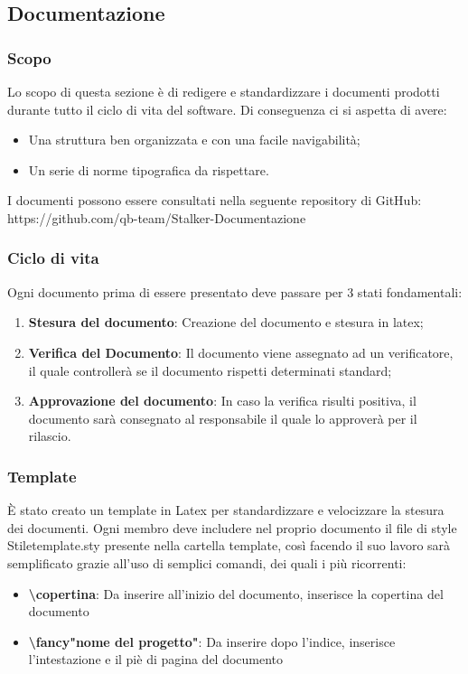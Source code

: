 \subsection{Documentazione}
\subsubsection{Scopo}
Lo scopo di questa sezione è di redigere e standardizzare i documenti prodotti durante tutto il ciclo di vita del software. 
Di conseguenza ci si aspetta di avere:
\begin{itemize}
\item Una struttura ben organizzata e con una facile navigabilità;
\item Un serie di norme tipografica da rispettare.
\end{itemize}
 
I documenti possono essere consultati nella seguente repository di GitHub: https://github.com/qb-team/Stalker-Documentazione

\subsubsection{Ciclo di vita}
Ogni documento prima di essere presentato deve passare per 3 stati fondamentali:
\begin{enumerate}
\item \textbf{Stesura del documento}: Creazione del documento e stesura in latex;
\item \textbf{Verifica del Documento}: Il documento viene assegnato ad un verificatore, il quale controllerà se il documento rispetti determinati standard;
\item \textbf{Approvazione del documento}: In caso la verifica risulti positiva, il documento sarà consegnato al responsabile il quale lo approverà per il rilascio.
\end{enumerate}

\subsubsection{Template}
È stato creato un template in Latex per standardizzare e velocizzare la stesura dei documenti.
Ogni membro deve includere nel proprio documento il file di style Stiletemplate.sty presente nella cartella template, così facendo il suo lavoro sarà semplificato grazie all'uso di semplici comandi, dei quali i più ricorrenti:
\begin{itemize}
\item \textbf{\textbackslash copertina{}}: Da inserire all'inizio del documento, inserisce la copertina del documento
\item \textbf{\textbackslash fancy"nome del progetto"{}}: Da inserire dopo l'indice, inserisce l'intestazione e il piè di pagina del documento
\end{itemize}

